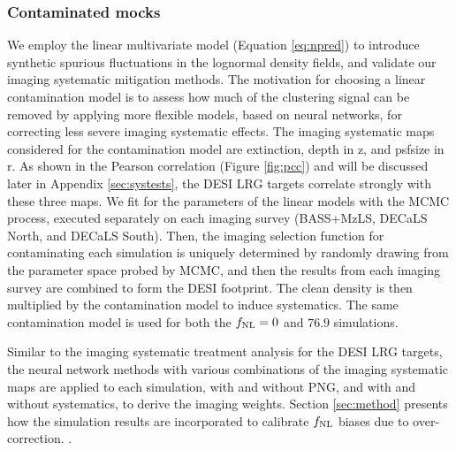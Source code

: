 \subsubsection{Contaminated mocks}
We employ the linear multivariate model (Equation \ref{eq:npred}) to introduce synthetic spurious fluctuations in the lognormal density fields, and validate our imaging systematic mitigation methods. The motivation for choosing a linear contamination model is to assess how much of the clustering signal can be removed by applying more flexible models, based on neural networks, for correcting less severe imaging systematic effects. The imaging systematic maps considered for the contamination model are extinction, depth in z, and psfsize in r. As shown in the Pearson correlation (Figure \ref{fig:pcc}) and will be discussed later in Appendix \ref{sec:systests}, the DESI LRG targets correlate strongly with these three maps. We fit for the parameters of the linear models with the MCMC process, executed separately on each imaging survey (BASS+MzLS, DECaLS North, and DECaLS South). Then, the imaging selection function for contaminating each simulation is uniquely determined by randomly drawing from the parameter space probed by MCMC, and then the results from each imaging survey are combined to form the DESI footprint. The clean density is then multiplied by the contamination model to induce systematics.  The same contamination model is used for both the $f_{\rm NL}=0$ and $76.9$ simulations.

Similar to the imaging systematic treatment analysis for the DESI LRG targets, the neural network methods with various combinations of the imaging systematic maps are applied to each simulation, with and without PNG, and with and without systematics, to derive the imaging weights. Section \ref{sec:method} presents how the simulation results are incorporated to calibrate $f_{\rm NL}$ biases due to over-correction.  \cite[see, also,][]{rezaie2021primordial}. 